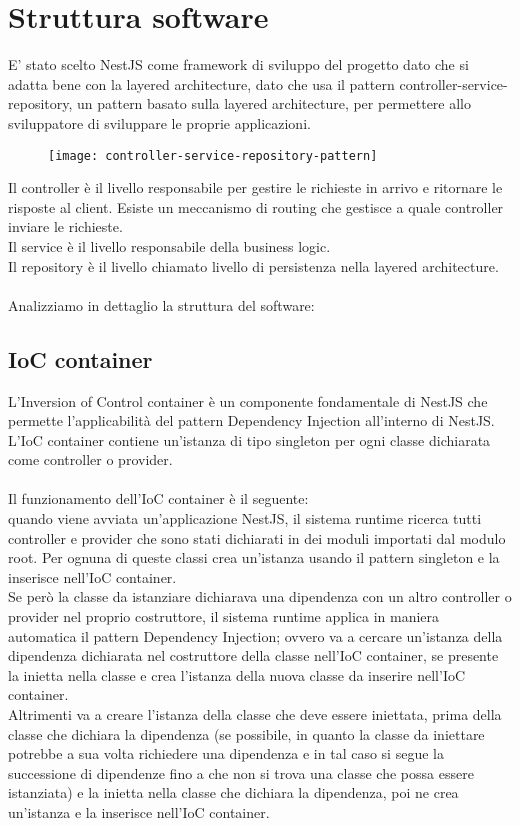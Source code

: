\section{Struttura software}
E' stato scelto NestJS come framework di sviluppo del progetto dato che si adatta bene con la layered architecture,
dato che usa il pattern controller-service-repository, un pattern basato sulla layered architecture,  
per permettere allo sviluppatore di sviluppare le proprie applicazioni.
\begin{figure}[!h]
    \centering
    \texttt{[image: controller-service-repository-pattern]}
\end{figure}
\leavevmode\newline
Il controller è il livello responsabile per gestire le richieste in arrivo e ritornare le risposte al client.
Esiste un meccanismo di routing che gestisce a quale controller inviare le richieste.
\\
Il service è il livello responsabile della business logic.
\\
Il repository è il livello chiamato livello di persistenza nella layered architecture.
\\\\
Analizziamo in dettaglio la struttura del software:

\subsection{IoC container}
L'Inversion of Control container è un componente fondamentale di NestJS che permette l'applicabilità
del pattern Dependency Injection all'interno di NestJS.
\\
L'IoC container contiene un'istanza di tipo singleton per ogni classe dichiarata come controller o provider.
\\\\
Il funzionamento dell'IoC container è il seguente:
\\
quando viene avviata un'applicazione NestJS, il sistema runtime ricerca tutti controller e provider che 
sono stati dichiarati in dei moduli importati dal modulo root. Per ognuna di queste classi crea un'istanza
usando il pattern singleton e la inserisce nell'IoC container. 
\\
Se però la classe da istanziare dichiarava una dipendenza con un altro controller o provider nel proprio 
costruttore, il sistema runtime applica in maniera automatica il pattern Dependency Injection; ovvero
va a cercare un'istanza della dipendenza dichiarata nel costruttore della classe nell'IoC container, se
presente la inietta nella classe e crea l'istanza della nuova classe da inserire nell'IoC container. 
\\
Altrimenti va a creare
l'istanza della classe che deve essere iniettata, prima della classe che dichiara la dipendenza (se possibile, in quanto la
classe da iniettare potrebbe a sua volta richiedere una dipendenza e in tal caso si segue la successione di 
dipendenze fino a che non si trova una classe che possa essere istanziata) e la inietta nella classe che dichiara
la dipendenza, poi ne crea un'istanza e la inserisce nell'IoC container.

